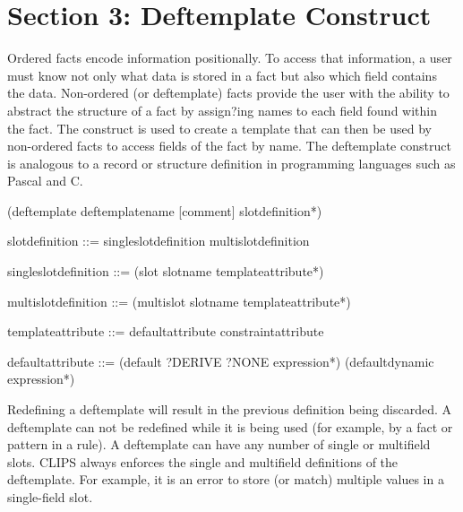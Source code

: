 \documentclass[letterpaper,10pt,english]{sphinxmanual}
\begin{document}
\chapter{Section 3: Deftemplate Construct}
\label{\detokenize{deftemplate:section-3-deftemplate-construct}}\label{\detokenize{deftemplate::doc}}
Ordered facts encode information positionally. To access that
information, a user must know not only what data is stored in a fact but
also which field contains the data. Non-ordered (or deftemplate) facts
provide the user with the ability to abstract the structure of a fact by
assign?ing names to each field found within the fact. The
 construct is used to create a template that can then be
used by non-ordered facts to access fields of the fact by name. The
deftemplate construct is analogous to a record or structure definition
in programming languages such as Pascal and C.


\begin{sphinxVerbatim}[commandchars=\\\{\}]
(deftemplate \PYGZlt{}deftemplate\PYGZhy{}name\PYGZgt{} [\PYGZlt{}comment\PYGZgt{}] \PYGZlt{}slot\PYGZhy{}definition\PYGZgt{}*)

   \PYGZlt{}slot\PYGZhy{}definition\PYGZgt{} ::= \PYGZlt{}single\PYGZhy{}slot\PYGZhy{}definition\PYGZgt{} \textbar{} \PYGZlt{}multislot\PYGZhy{}definition\PYGZgt{}

   \PYGZlt{}single\PYGZhy{}slot\PYGZhy{}definition\PYGZgt{} ::= (slot \PYGZlt{}slot\PYGZhy{}name\PYGZgt{} \PYGZlt{}template\PYGZhy{}attribute\PYGZgt{}*)

   \PYGZlt{}multislot\PYGZhy{}definition\PYGZgt{} ::= (multislot \PYGZlt{}slot\PYGZhy{}name\PYGZgt{} \PYGZlt{}template\PYGZhy{}attribute\PYGZgt{}*)

   \PYGZlt{}template\PYGZhy{}attribute\PYGZgt{} ::= \PYGZlt{}default\PYGZhy{}attribute\PYGZgt{} \textbar{} \PYGZlt{}constraint\PYGZhy{}attribute\PYGZgt{}

   \PYGZlt{}default\PYGZhy{}attribute\PYGZgt{} ::= (default ?DERIVE \textbar{} ?NONE \textbar{} \PYGZlt{}expression\PYGZgt{}*) \textbar{}
                             (default\PYGZhy{}dynamic \PYGZlt{}expression\PYGZgt{}*)
\end{sphinxVerbatim}

Redefining a deftemplate will result in the previous definition being
discarded. A deftemplate can not be redefined while it is being used
(for example, by a fact or pattern in a rule). A deftemplate can have
any number of single or multifield slots. CLIPS always enforces the
single and multifield definitions of the deftemplate. For example, it is
an error to store (or match) multiple values in a single-field slot.
\end{document}
